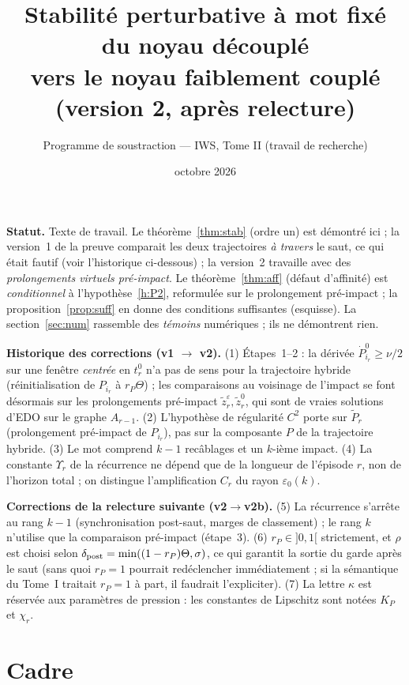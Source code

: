 \documentclass[11pt,a4paper]{article}
\title{Stabilité perturbative à mot fixé du noyau découplé\\
vers le noyau faiblement couplé\\[2pt]\large (version 2, après relecture)}
\author{Programme de soustraction --- IWS, Tome II (travail de recherche)}
\date{octobre 2026}
\theoremstyle{remark}
\theoremstyle{definition}
\newcommand{\eps}{\varepsilon}
\newcommand{\zt}{\widetilde z}
\newcommand{\Pt}{\widetilde P}
\begin{document}
\maketitle

\noindent\textbf{Statut.} Texte de travail. Le théorème~\ref{thm:stab} (ordre un) est démontré ici ; la version~1 de la preuve comparait les deux trajectoires \emph{à travers} le saut, ce qui était fautif (voir l'historique ci-dessous) ; la version~2 travaille avec des \emph{prolongements virtuels pré-impact}. Le théorème~\ref{thm:aff} (défaut d'affinité) est \emph{conditionnel} à l'hypothèse~\ref{h:P2}, reformulée sur le prolongement pré-impact ; la proposition~\ref{prop:suff} en donne des conditions suffisantes (esquisse). La section~\ref{sec:num} rassemble des \emph{témoins} numériques ; ils ne démontrent rien.

\noindent\textbf{Historique des corrections (v1 $\to$ v2).}
(1) Étapes~1--2 : la dérivée $\dot P^0_{i_r}\ge\nu/2$ sur une fenêtre \emph{centrée} en $t_r^0$ n'a pas de sens pour la trajectoire hybride (réinitialisation de $P_{i_r}$ à $r_P\Theta$) ; les comparaisons au voisinage de l'impact se font désormais sur les prolongements pré-impact $\zt^\eps_r,\zt^0_r$, qui sont de vraies solutions d'EDO sur le graphe $A_{r-1}$.
(2) L'hypothèse de régularité $C^2$ porte sur $\Pt_r$ (prolongement pré-impact de $P_{i_r}$), pas sur la composante $P$ de la trajectoire hybride.
(3) Le mot comprend $k-1$ recâblages et un $k$-ième impact.
(4) La constante $\Upsilon_r$ de la récurrence ne dépend que de la longueur de l'épisode $r$, non de l'horizon total ; on distingue l'amplification $C_r$ du rayon $\eps_0(k)$.

\noindent\textbf{Corrections de la relecture suivante (v2$\to$v2b).} (5) La récurrence s'arrête au rang $k-1$ (synchronisation post-saut, marges de classement) ; le rang $k$ n'utilise que la comparaison pré-impact (étape~3). (6) $r_P\in]0,1[$ strictement, et $\rho$ est choisi selon $\delta_{\rm post}=\min((1-r_P)\Theta,\sigma)$, ce qui garantit la sortie du garde après le saut (sans quoi $r_P=1$ pourrait redéclencher immédiatement ; si la sémantique du Tome~I traitait $r_P=1$ à part, il faudrait l'expliciter). (7) La lettre $\kappa$ est réservée aux paramètres de pression : les constantes de Lipschitz sont notées $K_P$ et $\chi_r$.

\section{Cadre}
\end{document}
